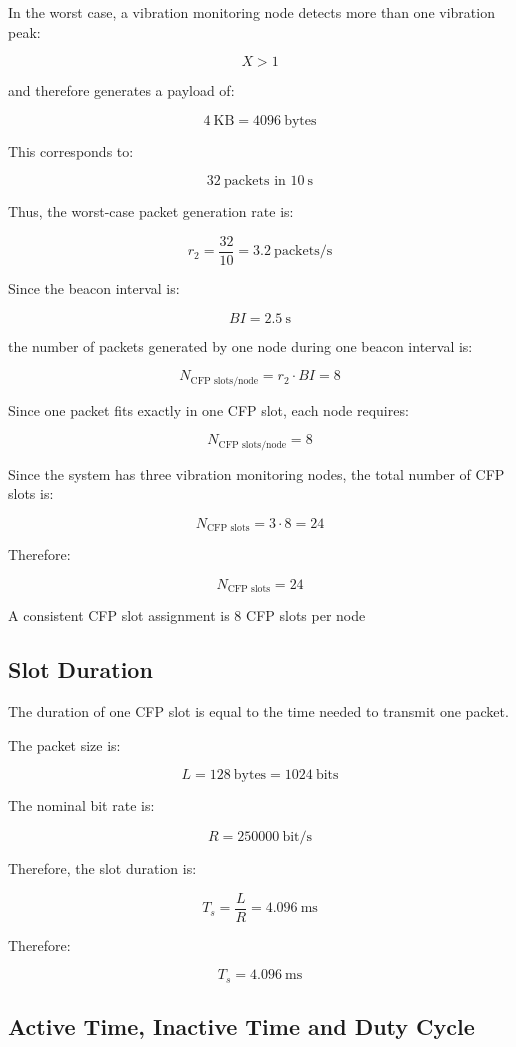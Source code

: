 \documentclass[a4paper,12pt]{article}
\begin{document}
In the worst case, a vibration monitoring node detects more than one vibration peak:

\[
X>1
\]

and therefore generates a payload of:

\[
4 \ \text{KB} = 4096 \ \text{bytes}
\]

This corresponds to:

\[
32 \ \text{packets in } 10 \ \text{s}
\]

Thus, the worst-case packet generation rate is:

\[
r_2 = \frac{32}{10} = 3.2 \ \text{packets/s}
\]

Since the beacon interval is:

\[
BI = 2.5 \ \text{s}
\]

the number of packets generated by one node during one beacon interval is:

\[
N_{\text{CFP slots/node}} = r_2 \cdot BI = 8
\]

Since one packet fits exactly in one CFP slot, each node requires:

\[
\boxed{N_{\text{CFP slots/node}} = 8}
\]

Since the system has three vibration monitoring nodes, the total number of CFP slots is:

\[
N_{\text{CFP slots}} = 3 \cdot 8 = 24
\]

Therefore:

\[
\boxed{N_{\text{CFP slots}} = 24}
\]

A consistent CFP slot assignment is 8 CFP slots per node

\subsection{Slot Duration}

The duration of one CFP slot is equal to the time needed to transmit one packet.

The packet size is:

\[
L = 128 \ \text{bytes} = 1024 \ \text{bits}
\]

The nominal bit rate is:

\[
R = 250000 \ \text{bit/s}
\]

Therefore, the slot duration is:

\[
T_s = \frac{L}{R} = 4.096 \ \text{ms}
\]


Therefore:

\[
\boxed{T_s = 4.096 \ \text{ms}}
\]

\subsection{Active Time, Inactive Time and Duty Cycle}
\end{document}
